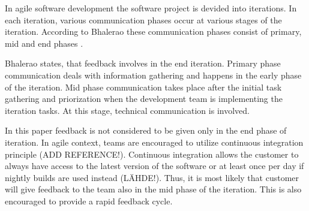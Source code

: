 \documentclass[conference]{IEEEtran}
\begin{document}
In agile software development the software project is devided into iterations. In each iteration, various communication phases occur at various stages of the iteration. According to Bhalerao these communication phases consist of primary, mid and end phases \cite{2010bhalerao}.

Bhalerao states, that feedback involves in the end iteration. Primary phase communication deals with information gathering and happens in the early phase of the iteration. Mid phase communication takes place after the initial task gathering and priorization when the development team is implementing the iteration tasks. At this stage, technical communication is involved. \cite{2010bhalerao}

In this paper feedback is not considered to be given only in the end phase of iteration. In agile context, teams are encouraged to utilize continuous integration principle (ADD REFERENCE!). Continuous integration allows the customer to always have access to the latest version of the software or at least once per day if nightly builds are used instead (LÄHDE!). Thus, it is most likely that customer will give feedback to the team also in the mid phase of the iteration. This is also encouraged to provide a rapid feedback cycle.
\end{document}
